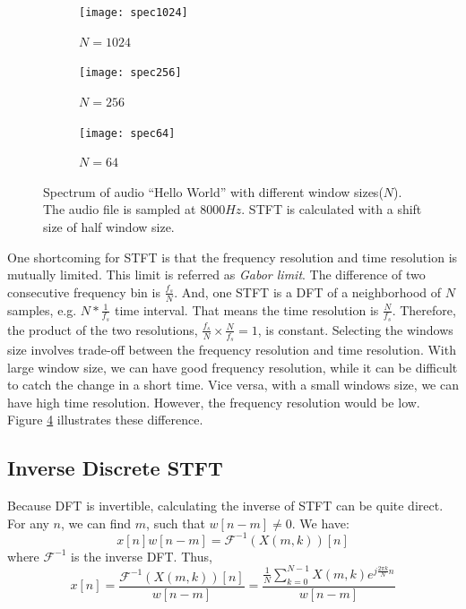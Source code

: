 \documentclass[12pt,final,twoside]{report}
\theoremstyle{plain}
\theoremstyle{definition}
\theoremstyle{remark}
\begin{document}
\begin{figure}[t]
  \centering
  \begin{subfigure}[b]{.8\textwidth}
    \texttt{[image: spec1024]}
    \caption{$N=1024$}
    \label{fig:spec1024}
  \end{subfigure}

  \begin{subfigure}[b]{.8\textwidth}
    \texttt{[image: spec256]}
    \caption{$N=256$}
    \label{fig:spec256}
  \end{subfigure}

  \begin{subfigure}[b]{.8\textwidth}
    \texttt{[image: spec64]}
    \caption{$N=64$}
    \label{fig:spec64}
  \end{subfigure}

  \caption{Spectrum of audio ``Hello World'' with different window sizes($N$). The audio file is sampled at $8000Hz$. STFT is calculated with a shift size of half window size.}
  \label{fig:spec}
\end{figure}

One shortcoming for STFT is that the frequency resolution and time resolution is mutually limited. This limit is referred as \textit{Gabor limit}. The difference of two consecutive frequency bin is $\frac{f_s}{N}$. And, one STFT is a DFT of a neighborhood of $N$ samples, e.g. $N * \frac{1}{f_s}$ time interval. That means the time resolution is $\frac{N}{f_s}$. Therefore, the product of the two resolutions, $\frac{f_s}{N} \times \frac{N}{f_s} = 1$, is constant. Selecting the windows size involves trade-off between the frequency resolution and time resolution. With large window size, we can have good frequency resolution, while it can be difficult to catch the change in a short time. Vice versa, with a small windows size, we can have high time resolution. However, the frequency resolution would be low. Figure \ref{fig:spec} illustrates these difference.

\subsection{Inverse Discrete STFT}
Because DFT is invertible, calculating the inverse of STFT can be quite direct. For any $n$, we can find $m$, such that $w[n-m] \neq 0$. We have:
\[ x[n]w[n-m] = \mathcal{F}^{-1}(X(m,k))[n] \]
where $\mathcal{F}^{-1}$ is the inverse DFT. Thus,
\begin{equation}
  x[n] =  \frac{\mathcal{F}^{-1}(X(m,k))[n]}{w[n-m]} = \frac{\frac{1}{N}\sum_{k=0}^{N-1} X(m,k)e^{j \frac{2\pi k}{N} n}}{w[n-m]}
  \label{eq:naiveinv}
\end{equation}
\end{document}
